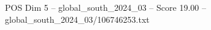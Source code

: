 \begin{textsample}{POS Dim 5 – global\_south\_2024\_03 – Score 19.00 – global\_south\_2024\_03/106746253.txt}
\end{textsample}
